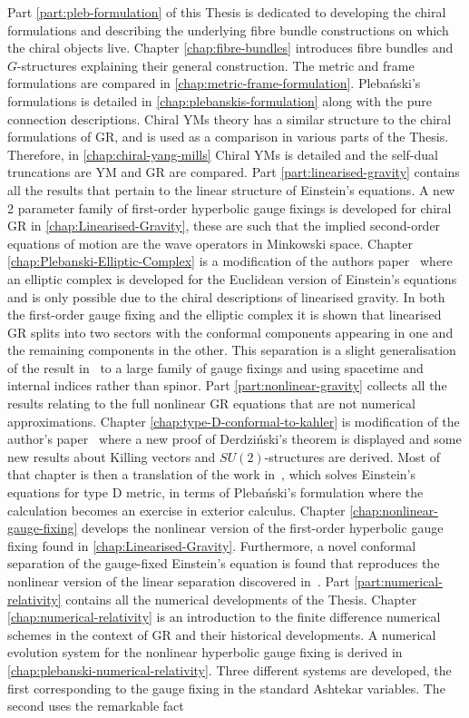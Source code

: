 \documentclass[10pt]{report}
\newcommand{\pleb}[0]{Pleba\'nski}
\newcommand{\derd}[0]{Derdzi\'nski}
\theoremstyle{definition}
\begin{document}
Part \ref{part:pleb-formulation} of this Thesis is dedicated to developing the chiral formulations and describing the underlying fibre bundle constructions on which the chiral objects live. Chapter \ref{chap:fibre-bundles} introduces fibre bundles and $G$-structures explaining their general construction. The metric and frame formulations are compared in \cref{chap:metric-frame-formulation}. \pleb{}'s formulations is detailed in \cref{chap:plebanskis-formulation} along with the pure connection descriptions. Chiral YMs theory has a similar structure to the chiral formulations of GR, and is used as a comparison in various parts of the Thesis. Therefore, in \cref{chap:chiral-yang-mills} Chiral YMs is detailed and the self-dual truncations are YM and GR are compared. Part \ref{part:linearised-gravity} contains all the results that pertain to the linear structure of Einstein's equations. A new 2 parameter family of first-order hyperbolic gauge fixings is developed for chiral GR in \cref{chap:Linearised-Gravity}, these are such that the implied second-order equations of motion are the wave operators in Minkowski space. Chapter \ref{chap:Plebanski-Elliptic-Complex} is a modification of the authors paper~\cite{Plebanski_compl_Krasno_2025} where an elliptic complex is developed for the Euclidean version of Einstein's equations and is only possible due to the chiral descriptions of linearised gravity. In both the first-order gauge fixing and the elliptic complex it is shown that linearised GR splits into two sectors with the conformal components appearing in one and the remaining components in the other. This separation is a slight generalisation of the result in~\cite{ChiralPerturbaKrasno2020} to a large family of gauge fixings and using spacetime and internal indices rather than spinor. Part \ref{part:nonlinear-gravity} collects all the results relating to the full nonlinear GR equations that are not numerical approximations. Chapter \ref{chap:type-D-conformal-to-kahler} is modification of the author's paper~\cite{Kerr_metric_fro_Krasno_2024} where a new proof of \derd{}'s theorem is displayed and some new results about Killing vectors and $SU(2)$-structures are derived. Most of that chapter is then a translation of the work in~\cite{AmbitoricGeomeAposto2013}, which solves Einstein's equations for type D metric, in terms of \pleb{}'s formulation where the calculation becomes an exercise in exterior calculus. Chapter \ref{chap:nonlinear-gauge-fixing} develops the nonlinear version of the first-order hyperbolic gauge fixing found in \cref{chap:Linearised-Gravity}. Furthermore, a novel conformal separation of the gauge-fixed Einstein's equation is found that reproduces the nonlinear version of the linear separation discovered in~\cite{ChiralPerturbaKrasno2020}. Part \ref{part:numerical-relativity} contains all the numerical developments of the Thesis. Chapter \ref{chap:numerical-relativity} is an introduction to the finite difference numerical schemes in the context of GR and their historical developments. A numerical evolution system for the nonlinear hyperbolic gauge fixing is derived in \cref{chap:plebanski-numerical-relativity}. Three different systems are developed, the first corresponding to the gauge fixing in the standard Ashtekar variables. The second uses the remarkable fact 
\end{document}
